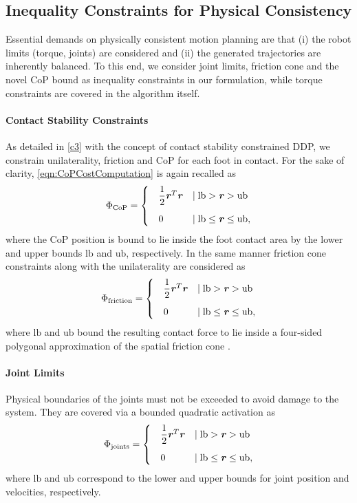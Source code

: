 \subsection{Inequality Constraints for Physical Consistency}
Essential demands on physically consistent motion planning are that (i) the robot limits (torque, joints) are considered and (ii) the generated trajectories are inherently balanced. To this end, we consider joint limits, friction cone and the novel \gls{CoP} bound as inequality constraints in our formulation, while torque constraints are covered in the algorithm itself.

\paragraph{Contact Stability Constraints}
As detailed in \cref{c3} with the concept of contact stability constrained \gls{DDP}, we constrain unilaterality, friction and \gls{CoP} for each foot in contact. For the sake of clarity, \cref{eqn:CoPCostComputation} is again recalled as 
\begin{equation*}
\Phi_{\text{CoP}}=
\begin{cases}
\quad\dfrac{1}{2}\bm{\mathit{r}}^T\bm{\mathit{r}} &\mid \text{lb} > \bm{\mathit{r}} > \text{ub} \\[10pt]
\quad 0 &\mid \text{lb} \leq \bm{\mathit{r}} \leq \text{ub},
\end{cases}
\end{equation*}
where the \gls{CoP} position is bound to lie inside the foot contact area by the lower and upper bounds $\text{lb}$ and $\text{ub}$, respectively.
In the same manner friction cone constraints along with the unilaterality are considered as
\begin{equation*}
\Phi_{\text{friction}}=
\begin{cases}
\quad\dfrac{1}{2}\bm{\mathit{r}}^T\bm{\mathit{r}} &\mid \text{lb} > \bm{\mathit{r}} > \text{ub} \\[10pt]
\quad 0 &\mid \text{lb} \leq \bm{\mathit{r}} \leq \text{ub},
\end{cases}
\end{equation*}
where $\text{lb}$ and $\text{ub}$ bound the resulting contact force to lie inside a four-sided polygonal approximation of the spatial friction cone \cite{kao2016contact}.

\paragraph{Joint Limits}
Physical boundaries of the joints must not be exceeded to avoid damage to the system. They are covered via a bounded quadratic activation as
\begin{equation*}
\Phi_{\text{joints}}=
\begin{cases}
\quad\dfrac{1}{2}\bm{\mathit{r}}^T\bm{\mathit{r}} &\mid \text{lb} > \bm{\mathit{r}} > \text{ub} \\[10pt]
\quad 0 &\mid \text{lb} \leq \bm{\mathit{r}} \leq \text{ub},
\end{cases}
\end{equation*}
where $\text{lb}$ and $\text{ub}$ correspond to the lower and upper bounds for joint position and velocities, respectively. 

